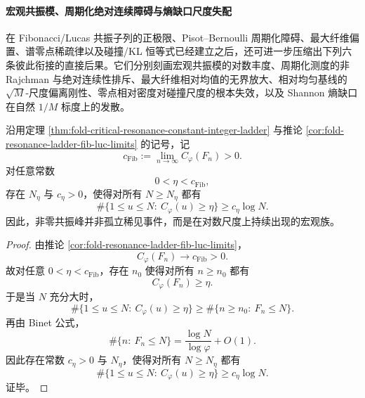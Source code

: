 \paragraph{宏观共振模、周期化绝对连续障碍与熵缺口尺度失配}
在 Fibonacci/Lucas 共振子列的正极限、Pisot--Bernoulli 周期化障碍、最大纤维偏置、谱零点稀疏律以及碰撞/KL 恒等式已经建立之后，还可进一步压缩出下列六条彼此衔接的直接后果。它们分别刻画宏观共振模的对数丰度、周期化测度的非 Rajchman 与绝对连续性排斥、最大纤维相对均值的无界放大、相对均匀基线的 \(\sqrt{M}\)-尺度偏离刚性、零点相对密度对碰撞尺度的根本失效，以及 Shannon 熵缺口在自然 \(1/M\) 标度上的发散。

\begin{theorem}[宏观共振模的对数丰度]\label{thm:xi-time-part66-macro-resonance-log-abundance}
沿用定理 \ref{thm:fold-critical-resonance-constant-integer-ladder} 与推论
\ref{cor:fold-resonance-ladder-fib-luc-limits} 的记号，记
\[
c_{\mathrm{Fib}}:=\lim_{n\to\infty}C_\varphi(F_n)>0.
\]
对任意常数
\[
0<\eta<c_{\mathrm{Fib}},
\]
存在 \(N_\eta\) 与 \(c_\eta>0\)，使得对所有 \(N\ge N_\eta\) 都有
\[
\boxed{\;
\#\{1\le u\le N:\ C_\varphi(u)\ge \eta\}
\ge
c_\eta\log N.\;}
\]
因此，非零共振峰并非孤立稀见事件，而是在对数尺度上持续出现的宏观族。
\end{theorem}
\begin{proof}
由推论 \ref{cor:fold-resonance-ladder-fib-luc-limits}，
\[
C_\varphi(F_n)\longrightarrow c_{\mathrm{Fib}}>0.
\]
故对任意 \(0<\eta<c_{\mathrm{Fib}}\)，存在 \(n_0\) 使得对所有 \(n\ge n_0\) 都有
\[
C_\varphi(F_n)\ge \eta.
\]
于是当 \(N\) 充分大时，
\[
\#\{1\le u\le N:\ C_\varphi(u)\ge \eta\}
\ge
\#\{n\ge n_0:\ F_n\le N\}.
\]
再由 Binet 公式，
\[
\#\{n:\ F_n\le N\}
=
\frac{\log N}{\log\varphi}+O(1).
\]
因此存在常数 \(c_\eta>0\) 与 \(N_\eta\)，使得对所有 \(N\ge N_\eta\) 都有
\[
\#\{1\le u\le N:\ C_\varphi(u)\ge \eta\}\ge c_\eta\log N.
\]
证毕。
\end{proof}

